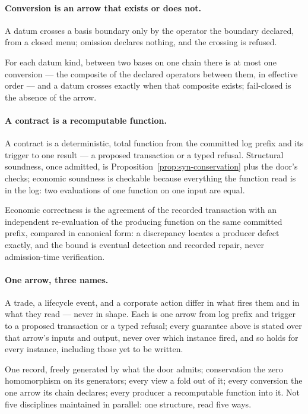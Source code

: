 \paragraph{Conversion is an arrow that exists or does not.} A datum crosses a
basis boundary only by the operator the boundary declared, from a closed menu;
omission declares nothing, and the crossing is refused.

\begin{proposition}\label{prop:syn-operators}
For each datum kind, between two bases on one chain there is at most one
conversion --- the composite of the declared operators between them, in
effective order --- and a datum crosses exactly when that composite exists;
fail-closed is the absence of the arrow.
\end{proposition}

\paragraph{A contract is a recomputable function.} A contract is a
deterministic, total function from the committed log prefix and its trigger to
one result --- a proposed transaction or a typed refusal. Structural soundness,
once admitted, is Proposition~\ref{prop:syn-conservation} plus the door's
checks; economic soundness is checkable because everything the function read
is in the log: two evaluations of one function on one input are equal.

\begin{proposition}\label{prop:syn-witness}
Economic correctness is the agreement of the recorded transaction with an
independent re-evaluation of the producing function on the same committed
prefix, compared in canonical form: a discrepancy locates a producer defect
exactly, and the bound is eventual detection and recorded repair, never
admission-time verification.
\end{proposition}

\paragraph{One arrow, three names.} A trade, a lifecycle event, and a
corporate action differ in what fires them and in what they read --- never in
shape. Each is one arrow from log prefix and trigger to a proposed transaction
or a typed refusal; every guarantee above is stated over that arrow's inputs
and output, never over which instance fired, and so holds for every instance,
including those yet to be written.

One record, freely generated by what the door admits; conservation the zero
homomorphism on its generators; every view a fold out of it; every conversion
the one arrow its chain declares; every producer a recomputable function into
it. Not five disciplines maintained in parallel: one structure, read five
ways.
